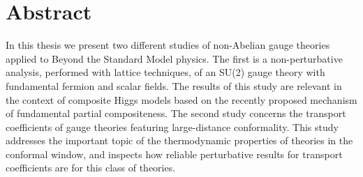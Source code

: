 \chapter*{Abstract}

In this thesis we present two different studies of non-Abelian gauge theories applied to Beyond the Standard Model physics. The first is a non-perturbative analysis, performed with lattice techniques, of an SU(2) gauge theory with fundamental fermion and scalar fields. The results of this study are relevant in the context of composite Higgs models based on the recently proposed mechanism of fundamental partial compositeness. The second study concerns the transport coefficients of gauge theories featuring large-distance conformality. This study addresses the important topic of the thermodynamic properties of theories in the conformal window, and inspects how reliable perturbative results for transport coefficients are for this class of theories.

